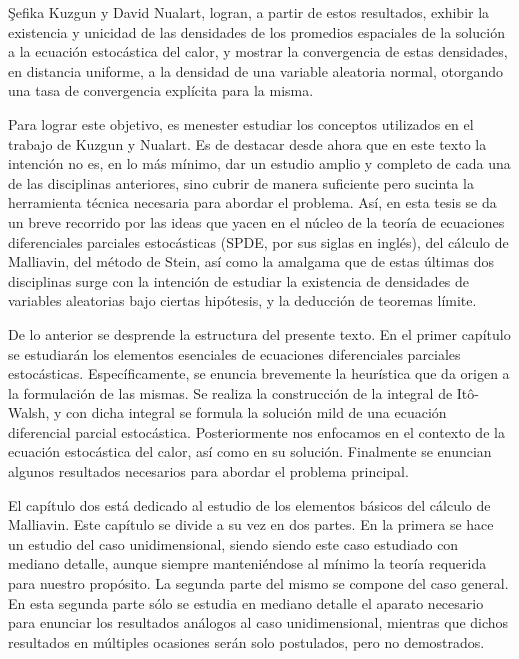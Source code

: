 \documentclass[letterpaper,twoside,12pt]{book}
\newcommand{\1}{\mathds{1}}
\theoremstyle{definition}
\theoremstyle{definition}
\theoremstyle{remark}
\theoremstyle{definition}
\theoremstyle{definition}
\theoremstyle{definition}
\theoremstyle{definition}
\theoremstyle{definition}
\begin{document}
\c{S}efika Kuzgun y David Nualart, \cite{KUZGUN202268} logran, a partir de estos resultados, exhibir la existencia y unicidad de las densidades de los promedios espaciales de la solución a la ecuación estocástica del calor, y mostrar la convergencia de estas densidades, en distancia uniforme, a la densidad de una variable aleatoria normal, otorgando una tasa de convergencia explícita para la misma.

Para lograr este objetivo, es menester estudiar los conceptos utilizados en el trabajo de Kuzgun y Nualart. Es de destacar desde ahora que en este texto la intención no es, en lo más mínimo, dar un estudio amplio y completo de cada una de las disciplinas anteriores, sino cubrir de manera suficiente pero sucinta la herramienta técnica necesaria para abordar el problema. Así, en esta tesis se da un breve recorrido por las ideas que yacen en el núcleo de la teoría de ecuaciones diferenciales parciales estocásticas (SPDE, por sus siglas en inglés), del cálculo de Malliavin, del método de Stein, así como la amalgama que de estas últimas dos disciplinas surge con la intención de estudiar la existencia de densidades de variables aleatorias bajo ciertas hipótesis, y la deducción de teoremas límite. 

De lo anterior se desprende la estructura del presente texto. En el primer capítulo se estudiarán los elementos esenciales de ecuaciones diferenciales parciales estocásticas. Específicamente, se enuncia brevemente la heurística que da origen a la formulación de las mismas. Se realiza la construcción de la integral de Itô-Walsh, y con dicha integral se formula la solución mild de una ecuación diferencial parcial estocástica. Posteriormente nos enfocamos en el contexto de la ecuación estocástica del calor, así como en su solución. Finalmente se enuncian algunos resultados necesarios para abordar el problema principal.

El capítulo dos está dedicado al estudio de los elementos básicos del cálculo de Malliavin. Este capítulo se divide a su vez en dos partes. En la primera se hace un estudio del caso unidimensional, siendo siendo este caso estudiado con mediano detalle, aunque siempre manteniéndose al mínimo la teoría requerida para nuestro propósito. La segunda parte del mismo se compone del caso general. En esta segunda parte sólo se estudia en mediano detalle el aparato necesario para enunciar los resultados análogos al caso unidimensional, mientras que dichos resultados en múltiples ocasiones serán solo postulados, pero no demostrados. 
\end{document}
